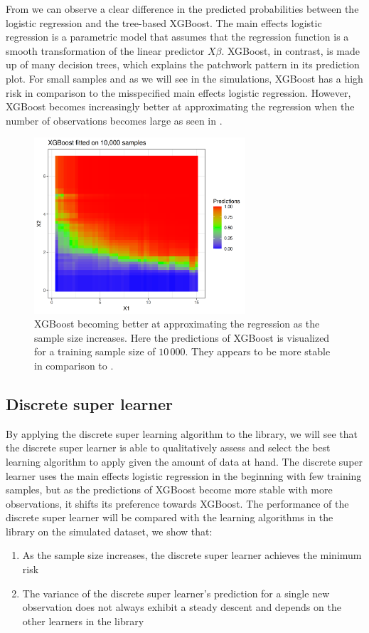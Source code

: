 \documentclass[./main.tex]{subfiles}
\begin{document}
From  we can observe a clear difference in the predicted probabilities between the logistic regression and the tree-based XGBoost. The main effects logistic regression is a parametric model that assumes that the regression function is a smooth transformation of the linear predictor $ X\beta $. XGBoost, in contrast, is made up of many decision trees, which explains the patchwork pattern in its prediction plot. For small samples and as we will see in the simulations, XGBoost has a high risk in comparison to the misspecified main effects logistic regression. However, XGBoost becomes increasingly better at approximating the regression when the number of observations becomes large as seen in . 
\begin{figure}[H]
    \centering
    \includegraphics[width=0.7\textwidth]{figures/xgboost10k.png}
    \caption{XGBoost becoming better at approximating the regression as the sample size increases. Here the predictions of XGBoost is visualized for a training sample size of $ 10\,000 $. They appears to be more stable in comparison to .}
    \label{fig:xgboost10k}
\end{figure}
\subsection{Discrete super learner}
By applying the discrete super learning algorithm to the library, we will see that the discrete super learner is able to qualitatively assess and select the best learning algorithm to apply given the amount of data at hand. The discrete super learner uses the main effects logistic regression in the beginning with few training samples, but as the predictions of XGBoost become more stable with more observations, it shifts its preference towards XGBoost. The performance of the discrete super learner will be compared with the learning algorithms in the library on the simulated dataset, we show that:
\begin{enumerate}
    \item As the sample size increases, the discrete super learner achieves the minimum risk 
    \item The variance of the discrete super learner's prediction for a single new observation does not always exhibit a steady descent and depends on the other learners in the library
\end{enumerate}
\end{document}
